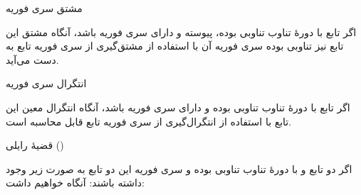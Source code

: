 \EMhold


\begin{EMtheorem}{مشتق سری فوریه}

اگر تابع  با دورهٔ تناوب  تناوبی بوده، پیوسته و دارای سری فوریه باشد، آنگاه مشتق این تابع نیز تناوبی بوده سری فوریه آن با استفاده از مشتق‌گیری از سری فوریه تابع به دست می‌آید.

\end{EMtheorem}

\begin{EMtheorem}{انتگرال سری فوریه}

اگر تابع  با دورهٔ تناوب  تناوبی بوده و دارای سری فوریه باشد، آنگاه انتگرال معین این تابع با استفاده از انتگرال‌گیری از سری فوریه تابع قابل محاسبه است.

\end{EMtheorem}

\EMhold


\begin{EMtheorem}{قضیهٔ رایلی ()}

اگر دو تابع  و  با دورهٔ تناوب  تناوبی بوده و سری فوریه این دو تابع به صورت زیر وجود داشته باشند:
آنگاه خواهیم داشت:

\end{EMtheorem}

